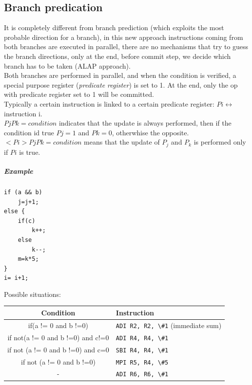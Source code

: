 \subsection{Branch predication}
It is completely different from branch prediction (which exploits the most
probable direction for a branch), in this new approach instructions coming from
both branches are executed in parallel, there are no mechanisms that try to
guess the branch directions, only at the end, before commit step, we decide
which branch has to be taken (ALAP approach).\\
Both branches are performed in parallel, and when the condition is verified, a
special purpose register (\textit{predicate register}) is set to 1.
At the end, only the op with predicate register set to 1 will be committed.\\
Typically a certain instruction is linked to a certain predicate register: $Pi
\leftrightarrow $ instruction i.\\
$Pj Pk = condition$ indicates that the update is always performed, then if the
condition id  true $Pj=1$ and $Pk=0$, otherwhise the opposite.\\
$<Pi> Pj Pk =condition$ means that the update of $P_j$ and $P_k$ is performed
only if $Pi$ is true.
\subparagraph{Example}
\begin{verbatim}
if (a && b)
    j=j+1;
else {
    if(c)
        k++;
    else
        k--;
    m=k*5;
}
i= i+1;
\end{verbatim}
Possible situations:
\begin{center}
  \begin{tabular}{|c|l|}
    \hline
    Condition& Instruction\\
    \hline
    if(a != 0 and b !=0)&         \verb|ADI R2, R2, \#1| (immediate sum)\\
    if not(a != 0 and b !=0) and c!=0&    \verb|ADI R4, R4, \#1|\\
    if not (a != 0 and b !=0) and c=0&    \verb|SBI R4, R4, \#1|\\
    if not (a != 0 and b !=0)&        \verb|MPI R5, R4, \#5|\\
    -&                    \verb|ADI R6, R6, \#1|\\
    \hline
  \end{tabular}
\end{center}
